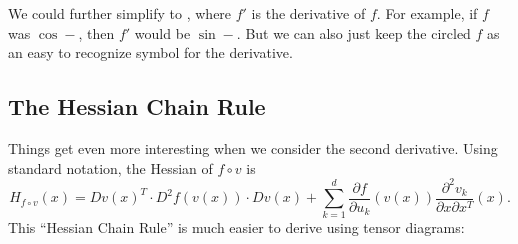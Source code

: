 We could further simplify  to , where $f'$ is the derivative of $f$.
For example, if $f$ was $\cos-$, then $f'$ would be $\sin-$.
But we can also just keep the circled $f$ as an easy to recognize symbol for the derivative.

\subsection{The Hessian Chain Rule}
Things get even more interesting when we consider the second derivative.
Using standard notation, the Hessian of $f\circ v$ is
\[
H_{f\circ v}(x) = Dv(x)^T \cdot D^2f(v(x)) \cdot Dv(x) + \sum_{k=1}^d \frac{\partial f}{\partial u_k}(v(x)) \frac{\partial^2 v_k}{\partial x \partial x^T}(x).
\]
This ``Hessian Chain Rule'' is much easier to derive using tensor diagrams:
